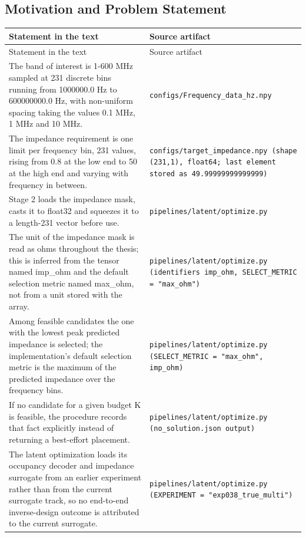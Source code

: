 \subsection*{Motivation and Problem Statement}
\begingroup\small
\begin{longtable}{p{} p{}}
\hline
Statement in the text & Source artifact \\
\hline
\endfirsthead
\hline
Statement in the text & Source artifact \\
\hline
\endhead
The band of interest is 1-600 MHz sampled at 231 discrete bins running from 1000000.0 Hz to 600000000.0 Hz, with non-uniform spacing taking the values 0.1 MHz, 1 MHz and 10 MHz. & \texttt{configs/\allowbreak{}Frequency\_\allowbreak{}data\_\allowbreak{}hz.npy} \\
The impedance requirement is one limit per frequency bin, 231 values, rising from 0.8 at the low end to 50 at the high end and varying with frequency in between. & \texttt{configs/\allowbreak{}target\_\allowbreak{}impedance.npy (shape (231,1), float64; last element stored as 49.99999999999999)} \\
Stage 2 loads the impedance mask, casts it to float32 and squeezes it to a length-231 vector before use. & \texttt{pipelines/\allowbreak{}latent/\allowbreak{}optimize.py} \\
The unit of the impedance mask is read as ohms throughout the thesis; this is inferred from the tensor named imp\_ohm and the default selection metric named max\_ohm, not from a unit stored with the array. & \texttt{pipelines/\allowbreak{}latent/\allowbreak{}optimize.py (identifiers imp\_\allowbreak{}ohm, SELECT\_\allowbreak{}METRIC = "max\_\allowbreak{}ohm")} \\
Among feasible candidates the one with the lowest peak predicted impedance is selected; the implementation's default selection metric is the maximum of the predicted impedance over the frequency bins. & \texttt{pipelines/\allowbreak{}latent/\allowbreak{}optimize.py (SELECT\_\allowbreak{}METRIC = "max\_\allowbreak{}ohm", imp\_\allowbreak{}ohm)} \\
If no candidate for a given budget K is feasible, the procedure records that fact explicitly instead of returning a best-effort placement. & \texttt{pipelines/\allowbreak{}latent/\allowbreak{}optimize.py (no\_\allowbreak{}solution.json output)} \\
The latent optimization loads its occupancy decoder and impedance surrogate from an earlier experiment rather than from the current surrogate track, so no end-to-end inverse-design outcome is attributed to the current surrogate. & \texttt{pipelines/\allowbreak{}latent/\allowbreak{}optimize.py (EXPERIMENT = "exp038\_\allowbreak{}true\_\allowbreak{}multi")} \\

\end{longtable}
